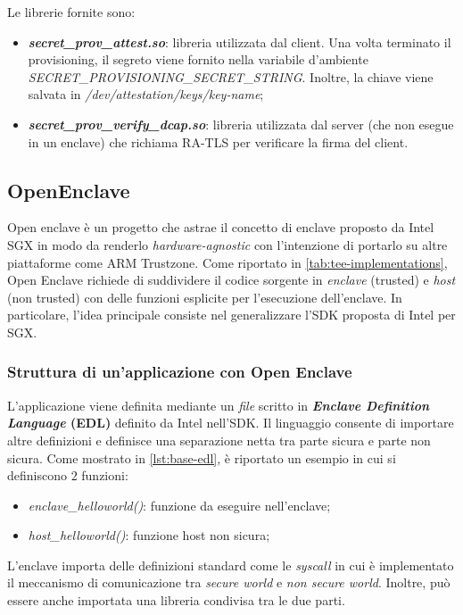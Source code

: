 \documentclass{article}
\begin{document}
Le librerie fornite sono:
\begin{itemize}
  \item \textbf{\textit{secret\_prov\_attest.so}}: libreria utilizzata dal client. Una volta terminato il provisioning, il segreto viene fornito nella variabile d'ambiente \textit{SECRET\_PROVISIONING\_SECRET\_STRING}. Inoltre, la chiave viene salvata in \textit{/dev/attestation/keys/key-name};
  \item \textbf{\textit{secret\_prov\_verify\_dcap.so}}: libreria utilizzata dal server (che non esegue in un enclave) che richiama RA-TLS per verificare la firma del client.
\end{itemize}

\subsection{OpenEnclave}
Open enclave è un progetto che astrae il concetto di enclave proposto da Intel SGX in modo da renderlo \textit{hardware-agnostic} con l'intenzione di portarlo su altre piattaforme come ARM Trustzone. Come riportato in \cref{tab:tee-implementations}, Open Enclave richiede di suddividere il codice sorgente in \textit{enclave} (trusted) e \textit{host} (non trusted) con delle funzioni esplicite per l'esecuzione dell'enclave. In particolare, l'idea principale consiste nel generalizzare l'SDK proposta di Intel per SGX\cite{IntelSDK}.

\subsubsection{Struttura di un'applicazione con Open Enclave}
L'applicazione viene definita mediante un \textit{file} scritto in \textbf{\textit{Enclave Definition Language} (EDL)} definito da Intel nell'SDK\cite{IntelSDK}. Il linguaggio consente di importare altre definizioni e definisce una separazione netta tra parte sicura e parte non sicura. Come mostrato in \cref{lst:base-edl}, è riportato un esempio in cui si definiscono $2$ funzioni:
\begin{itemize}
  \item \textit{enclave\_helloworld()}: funzione da eseguire nell'enclave;
  \item \textit{host\_helloworld()}:  funzione host non sicura;
\end{itemize}
L'enclave importa delle definizioni standard come le \textit{syscall} in cui è implementato il meccanismo di comunicazione tra \textit{secure world} e \textit{non secure world}. Inoltre, può essere anche importata una libreria condivisa tra le due parti.
\end{document}
